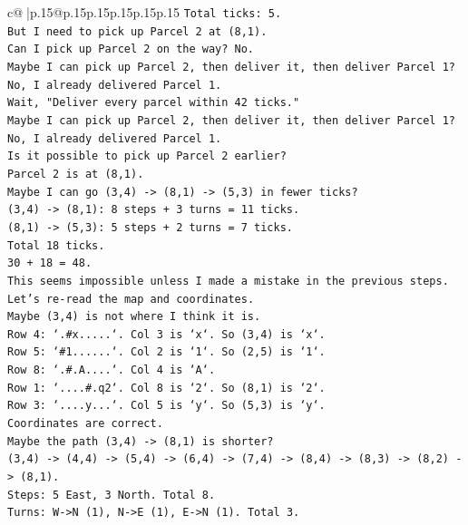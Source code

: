 \documentclass{article}
\begin{document}
{\begin{supertabular}{c@{$\;$}|p{.15\linewidth}@{}p{.15\linewidth}p{.15\linewidth}p{.15\linewidth}p{.15\linewidth}p{.15\linewidth}}
{{{\texttt{Total ticks: 5.} \\
\texttt{But I need to pick up Parcel 2 at (8,1).} \\
\texttt{Can I pick up Parcel 2 on the way? No.} \\
\texttt{Maybe I can pick up Parcel 2, then deliver it, then deliver Parcel 1?} \\
\texttt{No, I already delivered Parcel 1.} \\
\texttt{Wait, "Deliver every parcel within 42 ticks."} \\
\texttt{Maybe I can pick up Parcel 2, then deliver it, then deliver Parcel 1?} \\
\texttt{No, I already delivered Parcel 1.} \\
\texttt{Is it possible to pick up Parcel 2 earlier?} \\
\texttt{Parcel 2 is at (8,1).} \\
\texttt{Maybe I can go (3,4) {-}> (8,1) {-}> (5,3) in fewer ticks?} \\
\texttt{(3,4) {-}> (8,1): 8 steps + 3 turns = 11 ticks.} \\
\texttt{(8,1) {-}> (5,3): 5 steps + 2 turns = 7 ticks.} \\
\texttt{Total 18 ticks.} \\
\texttt{30 + 18 = 48.} \\
\texttt{This seems impossible unless I made a mistake in the previous steps.} \\
\texttt{Let's re{-}read the map and coordinates.} \\
\texttt{Maybe (3,4) is not where I think it is.} \\
\texttt{Row 4: `.\#x.....`. Col 3 is `x`. So (3,4) is `x`.} \\
\texttt{Row 5: `\#1......`. Col 2 is `1`. So (2,5) is `1`.} \\
\texttt{Row 8: `.\#.A....`. Col 4 is `A`.} \\
\texttt{Row 1: `....\#.q2`. Col 8 is `2`. So (8,1) is `2`.} \\
\texttt{Row 3: `....y...`. Col 5 is `y`. So (5,3) is `y`.} \\
\texttt{Coordinates are correct.} \\
\texttt{Maybe the path (3,4) {-}> (8,1) is shorter?} \\
\texttt{(3,4) {-}> (4,4) {-}> (5,4) {-}> (6,4) {-}> (7,4) {-}> (8,4) {-}> (8,3) {-}> (8,2) {-}> (8,1).} \\
\texttt{Steps: 5 East, 3 North. Total 8.} \\
\texttt{Turns: W{-}>N (1), N{-}>E (1), E{-}>N (1). Total 3.} \\
}}}
\end{supertabular}}
\end{document}
